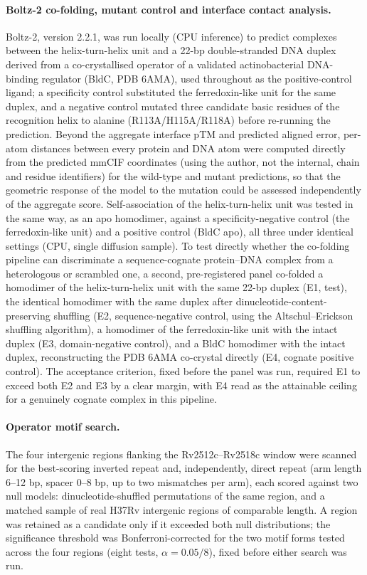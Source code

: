\documentclass[11pt,a4paper]{article}
\begin{document}
\paragraph{Boltz-2 co-folding, mutant control and interface contact analysis.} Boltz-2, version 2.2.1,
\citep{wohlwend2025boltz2} was run locally (CPU inference) to predict complexes between the
helix-turn-helix unit and a 22-bp double-stranded DNA duplex derived from a co-crystallised
operator of a validated actinobacterial DNA-binding regulator (BldC, PDB 6AMA), used throughout as
the positive-control ligand; a specificity control substituted the ferredoxin-like unit for the
same duplex, and a negative control mutated three candidate basic residues of the recognition
helix to alanine (R113A/H115A/R118A) before re-running the prediction. Beyond the aggregate
interface pTM and predicted aligned error, per-atom distances between every protein and DNA atom
were computed directly from the predicted mmCIF coordinates (using the author, not the internal,
chain and residue identifiers) for the wild-type and mutant predictions, so that the geometric
response of the model to the mutation could be assessed independently of the aggregate score.
Self-association of the helix-turn-helix unit was tested in the same way, as an apo homodimer,
against a specificity-negative control (the ferredoxin-like unit) and a positive control (BldC
apo), all three under identical settings (CPU, single diffusion sample). To test directly whether
the co-folding pipeline can discriminate a sequence-cognate protein--DNA complex from a
heterologous or scrambled one, a second, pre-registered panel co-folded a homodimer of the
helix-turn-helix unit with the same 22-bp duplex (E1, test), the identical homodimer with the same
duplex after dinucleotide-content-preserving shuffling (E2, sequence-negative control, using the
Altschul--Erickson shuffling algorithm), a homodimer of the ferredoxin-like unit with the intact
duplex (E3, domain-negative control), and a BldC homodimer with the intact duplex, reconstructing
the PDB 6AMA co-crystal directly (E4, cognate positive control). The acceptance criterion, fixed
before the panel was run, required E1 to exceed both E2 and E3 by a clear margin, with E4 read as
the attainable ceiling for a genuinely cognate complex in this pipeline.

\paragraph{Operator motif search.} The four intergenic regions flanking the Rv2512c--Rv2518c
window were scanned for the best-scoring inverted repeat and, independently, direct repeat (arm
length 6--12 bp, spacer 0--8 bp, up to two mismatches per arm), each scored against two null
models: dinucleotide-shuffled permutations of the same region, and a matched sample of real H37Rv
intergenic regions of comparable length. A region was retained as a candidate only if it exceeded
both null distributions; the significance threshold was Bonferroni-corrected for the two motif
forms tested across the four regions (eight tests, $\alpha=0.05/8$), fixed before either search was
run.
\end{document}
